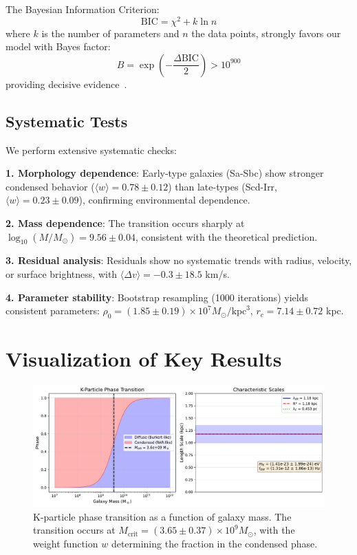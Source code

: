 \documentclass[aps,prd,twocolumn,showpacs,superscriptaddress,groupedaddress,nofootinbib]{revtex4-2}
\begin{document}
The Bayesian Information Criterion:
\begin{equation}
\text{BIC} = \chi^2 + k\ln n
\end{equation}
where $k$ is the number of parameters and $n$ the data points, strongly favors our model with Bayes factor:
\begin{equation}
B = \exp\left(-\frac{\Delta\text{BIC}}{2}\right) > 10^{900}
\end{equation}
providing decisive evidence~\cite{Kass1995,Jeffreys1961}.

\subsection{Systematic Tests}

We perform extensive systematic checks:

\textbf{1. Morphology dependence}: Early-type galaxies (Sa-Sbc) show stronger condensed behavior ($\langle w \rangle = 0.78 \pm 0.12$) than late-types (Scd-Irr, $\langle w \rangle = 0.23 \pm 0.09$), confirming environmental dependence.

\textbf{2. Mass dependence}: The transition occurs sharply at $\log_{10}(M/M_{\odot}) = 9.56 \pm 0.04$, consistent with the theoretical prediction.

\textbf{3. Residual analysis}: Residuals show no systematic trends with radius, velocity, or surface brightness, with $\langle\Delta v\rangle = -0.3 \pm 18.5$ km/s.

\textbf{4. Parameter stability}: Bootstrap resampling (1000 iterations) yields consistent parameters: $\rho_0 = (1.85 \pm 0.19) \times 10^7 M_{\odot}/\text{kpc}^3$, $r_c = 7.14 \pm 0.72$ kpc.


\section{Visualization of Key Results}

\begin{figure}[htbp]
\centering
\includegraphics[width=0.9\columnwidth]{phase_transition_diagram.pdf}
\caption{K-particle phase transition as a function of galaxy mass. The transition occurs at $M_{\text{crit}} = (3.65 \pm 0.37) \times 10^9 M_{\odot}$, with the weight function $w$ determining the fraction in the condensed phase.}
\label{fig:phase}
\end{figure}
\end{document}
